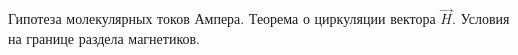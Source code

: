 \documentclass[__main__.tex]{subfiles}
\begin{document}
Гипотеза молекулярных токов Ампера. Теорема о циркуляции вектора $\vec{H}$. Условия на границе раздела магнетиков.\\ 

\end{document}
